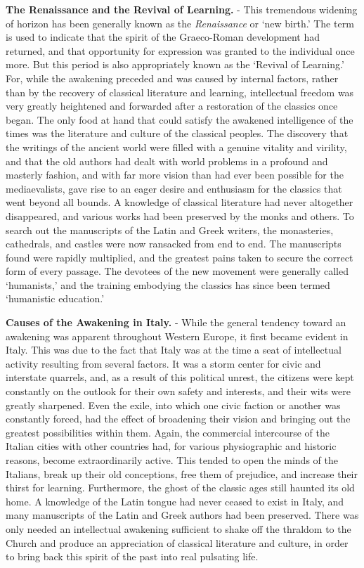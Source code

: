 \documentclass[]{book}
\begin{document}
\textbf{The Renaissance and the Revival of Learning.} - This tremendous widening of horizon has been generally known as the \emph{Renaissance} or `new birth.' The term is used to indicate that the spirit of the Graeco-Roman development had returned, and that opportunity for expression was granted to the individual once more. But this period is also appropriately known as the `Revival of Learning.' For, while the awakening preceded and was caused by internal factors, rather than by the recovery of classical literature and learning, intellectual freedom was very greatly heightened and forwarded after a restoration of the classics once began. The only food at hand that could satisfy the awakened intelligence of the times was the literature and culture of the classical peoples. The discovery that the writings of the ancient world were filled with a genuine vitality and virility, and that the old authors had dealt with world problems in a profound and masterly fashion, and with far more vision than had ever been possible for the mediaevalists, gave rise to an eager desire and enthusiasm for the classics that went beyond all bounds. A knowledge of classical literature had never altogether disappeared, and various works had been preserved by the monks and others. To search out the manuscripts of the Latin and Greek writers, the monasteries, cathedrals, and castles were now ransacked from end to end. The manuscripts found were rapidly multiplied, and the greatest pains taken to secure the correct form of every passage. The devotees of the new movement were generally called `humanists,' and the training embodying the classics has since been termed `humanistic education.'

\textbf{Causes of the Awakening in Italy.} - While the general tendency toward an awakening was apparent throughout Western Europe, it first became evident in Italy. This was due to the fact that Italy was at the time a seat of intellectual activity resulting from several factors. It was a storm center for civic and interstate quarrels, and, as a result of this political unrest, the citizens were kept constantly on the outlook for their own safety and interests, and their wits were greatly sharpened. Even the exile, into which one civic faction or another was constantly forced, had the effect of broadening their vision and bringing out the greatest possibilities within them. Again, the commercial intercourse of the Italian cities with other countries had, for various physiographic and historic reasons, become extraordinarily active. This tended to open the minds of the Italians, break up their old conceptions, free them of prejudice, and increase their thirst for learning. Furthermore, the ghost of the classic ages still haunted its old home. A knowledge of the Latin tongue had never ceased to exist in Italy, and many manuscripts of the Latin and Greek authors had been preserved. There was only needed an intellectual awakening sufficient to shake off the thraldom to the Church and produce an appreciation of classical literature and culture, in order to bring back this spirit of the past into real pulsating life.
\end{document}
